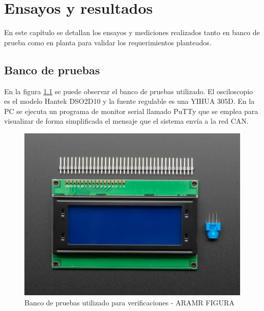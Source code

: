 
\chapter{Ensayos y resultados} %

\label{Chapter4} %

En este capítulo se detallan los ensayos y mediciones realizados tanto en banco de prueba como en planta para validar los requerimientos planteados. 


\section{Banco de pruebas}

En la figura \ref{fig:Banco} se puede observar el banco de pruebas utilizado. El osciloscopio es el modelo Hantek DSO2D10\citep{web_hantek} y la fuente regulable es una YIHUA 305D\citep{web_yihua}. En la PC se ejecuta un programa de monitor serial llamado PuTTy\citep{web_putty} que se emplea para visualizar de forma simplificada el mensaje que el sistema envía a la red CAN.

\begin{figure}[htbp]
	\centering
	\includegraphics[scale=1]{./Figures/LCD.jpg}
	\caption{Banco de pruebas utilizado para verificaciones - ARAMR FIGURA}
	\label{fig:Banco}
\end{figure}


